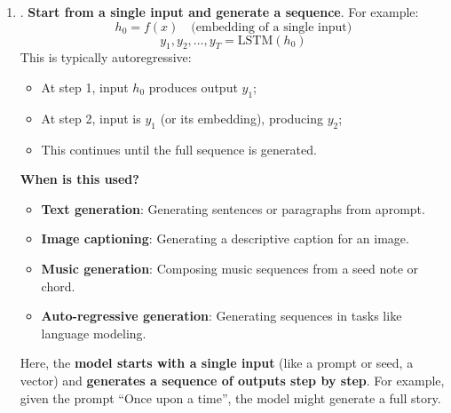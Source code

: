 \begin{enumerate}
    \item {}. \textbf{Start from a single input and generate a sequence}. For example:
    \begin{equation*}
        h_{0} = f(x) \quad \text{(embedding of a single input)}
    \end{equation*}
    \begin{equation*}
        y_1, y_2, \ldots, y_T = \text{LSTM}\left(h_0\right)
    \end{equation*}
    This is typically autoregressive:
    \begin{itemize}
        \item At step 1, input $h_0$ produces output $y_1$;
        \item At step 2, input is $y_1$ (or its embedding), producing $y_2$;
        \item This continues until the full sequence is generated.
    \end{itemize}
    \textcolor{Green3}{ \textbf{When is this used?}}
    \begin{itemize}
        \item \textbf{Text generation}: Generating sentences or paragraphs from a\break prompt.
        \item \textbf{Image captioning}: Generating a descriptive caption for an image.
        \item \textbf{Music generation}: Composing music sequences from a seed note or chord.
        \item \textbf{Auto-regressive generation}: Generating sequences in tasks like language modeling.
    \end{itemize}
    Here, the \textbf{model starts with a single input} (like a prompt or seed, a vector) and \textbf{generates a sequence of outputs step by step}. For example, given the prompt ``Once upon a time'', the model might generate a full story.



\end{enumerate}
